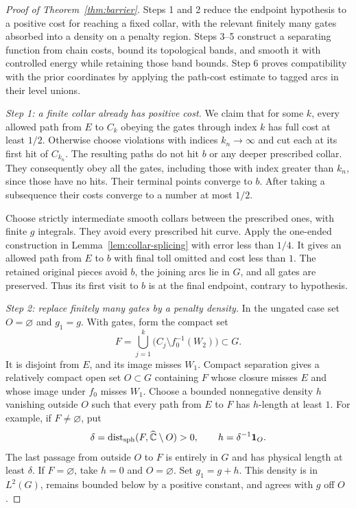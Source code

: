 \begin{proof}[Proof of Theorem~\ref{thm:barrier}]
Steps 1 and 2 reduce the endpoint hypothesis to a positive cost for
reaching a fixed collar, with the relevant finitely many gates absorbed
into a density on a penalty region.  Steps 3--5 construct a separating
function from chain costs, bound its topological bands, and smooth it
with controlled energy while retaining those band bounds.  Step 6
proves compatibility with the prior coordinates by applying the path-cost estimate to
tagged arcs in their level unions.

\emph{Step 1: a finite collar already has positive cost.}
We claim that for some $k$, every allowed path from $E$ to $C_k$
obeying the gates through index $k$ has full cost at least $1/2$.
Otherwise choose violations with indices $k_n\to\infty$ and cut each at its first
hit of $C_{k_n}$.  The resulting paths do not hit $b$ or any deeper
prescribed collar.  They consequently obey all the gates, including
those with index greater than $k_n$, since those have no hits.
Their terminal points converge to $b$.  After taking a subsequence
their costs converge to a number at most $1/2$.

Choose strictly intermediate smooth collars between the prescribed
ones, with finite $g$ integrals.  They avoid every prescribed hit
curve.  Apply the one-ended construction in
Lemma~\ref{lem:collar-splicing} with error less than $1/4$.
It gives an allowed path from $E$ to $b$ with final toll omitted
and cost less than $1$.  The retained original pieces avoid $b$,
the joining arcs lie in $G$, and all gates are preserved.  Thus its
first visit to $b$ is at the final endpoint, contrary to hypothesis.

\emph{Step 2: replace finitely many gates by a penalty density.}
In the ungated case set $O=\varnothing$ and $g_1=g$.
With gates, form the compact set
\[
 F=\bigcup_{j=1}^k\bigl(C_j\setminus f_0^{-1}(W_2)\bigr)
       \subset G.
\]
It is disjoint from $E$, and its image misses $W_1$.  Compact
separation gives a relatively compact open set $O\subset G$ containing
$F$ whose closure misses $E$ and whose image under $f_0$ misses $W_1$.
Choose a bounded nonnegative density $h$ vanishing outside $O$ such that
every path from $E$ to $F$ has $h$-length at least $1$.  For example,
if $F\ne\varnothing$, put
\[
 \delta=\operatorname{dist}_{\mathrm{sph}}(F,\widehat{\mathbb C}\setminus O)>0,
 \qquad h=\delta^{-1}\mathbf 1_O.
\]
The last passage from outside $O$ to $F$ is entirely in $G$ and has
physical length at least $\delta$.  If $F=\varnothing$, take $h=0$
and $O=\varnothing$.  Set $g_1=g+h$.  This density is in $L^2(G)$,
remains bounded below by a positive constant, and agrees with $g$
off $O$.


\end{proof}
